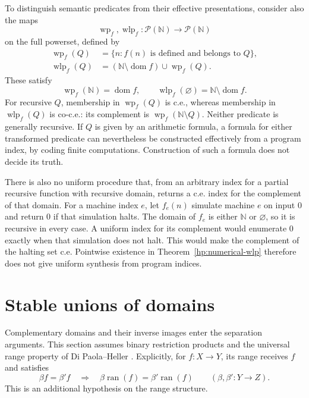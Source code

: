 \documentclass[11pt]{article}
\theoremstyle{definition}
\theoremstyle{remark}
\newcommand{\ran}{\operatorname{ran}}
\newcommand{\N}{\mathbb N}
\begin{document}
To distinguish semantic predicates from their effective presentations,
consider also the maps
\[
 \operatorname{wp}_f,\operatorname{wlp}_f:
 \mathcal P(\N)\longrightarrow\mathcal P(\N)
\]
on the full powerset, defined by
\begin{align*}
 \operatorname{wp}_f(Q)
 &=\{n:f(n)\text{ is defined and belongs to }Q\},\\
 \operatorname{wlp}_f(Q)
 &=(\N\setminus\operatorname{dom}f)\cup\operatorname{wp}_f(Q).
\end{align*}
These satisfy
\begin{equation}\label{hp:halting-predicates}
 \operatorname{wp}_f(\N)=\operatorname{dom}f,
 \qquad
 \operatorname{wlp}_f(\varnothing)=\N\setminus\operatorname{dom}f.
\end{equation}
For recursive $Q$, membership in $\operatorname{wp}_f(Q)$ is c.e.,
whereas membership in $\operatorname{wlp}_f(Q)$ is co-c.e.:
its complement is $\operatorname{wp}_f(\N\setminus Q)$. Neither
predicate is generally recursive. If $Q$ is given by an arithmetic
formula, a formula for either transformed predicate can nevertheless be
constructed effectively from a program index, by coding finite
computations. Construction of such a formula does not decide its truth.

There is also no uniform procedure that, from an arbitrary index for a
partial recursive function with recursive domain, returns a c.e. index
for the complement of that domain. For a machine index $e$, let
$f_e(n)$ simulate machine $e$ on input $0$ and return $0$ if that
simulation halts. The domain of $f_e$ is either $\N$ or
$\varnothing$, so it is recursive in every case. A uniform index for
its complement would enumerate $0$ exactly when that simulation does
not halt. This would make the complement of the halting set c.e.
Pointwise existence in Theorem~\ref{hp:numerical-wlp} therefore does not
give uniform synthesis from program indices.

\section{Stable unions of domains}\label{ct:union-section}

Complementary domains and their inverse images enter the separation
arguments. This section assumes binary restriction products and the universal
range property of Di Paola--Heller \cite[Definition~5.1]{DPH}.
Explicitly, for
$f:X\to Y$, its range receives $f$ and satisfies
\begin{equation}\label{ct:universal-range}
 \beta f=\beta'f\quad\Longrightarrow\quad
 \beta\ran(f)=\beta'\ran(f)
 \qquad(\beta,\beta':Y\to Z).
\end{equation}
This is an additional hypothesis on the range structure.
\end{document}
